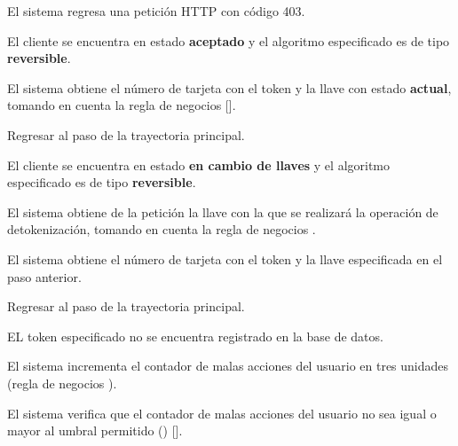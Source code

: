 {\begin{trayectoriaAlternativa}
    \item El sistema regresa una petición HTTP con código 403.

  \end{trayectoriaAlternativa}

  \begin{trayectoriaAlternativa}
    {El cliente se encuentra en estado \textbf{aceptado} y el algoritmo
    especificado es de tipo \textbf{reversible}.}

    \item El sistema obtiene el número de tarjeta con el token y la llave
      con estado \textbf{actual}, tomando en cuenta la regla de negocios
      [].

    \item Regresar al paso  de la trayectoria
      principal.

  \end{trayectoriaAlternativa}

  \begin{trayectoriaAlternativa}
    {El cliente se encuentra en estado \textbf{en cambio de llaves} y el
    algoritmo especificado es de tipo \textbf{reversible}.}

    \item El sistema obtiene de la petición la llave con la que se realizará
      la operación de detokenización, tomando en cuenta la regla de negocios
      .

    \item El sistema obtiene el número de tarjeta con el token y la llave
      especificada en el paso anterior.

    \item Regresar al paso  de la trayectoria
      principal.

  \end{trayectoriaAlternativa}

  \begin{trayectoriaAlternativa}
    {EL token especificado no se encuentra registrado en la base de datos.}

    \item El sistema incrementa el contador de malas acciones del usuario
      en tres unidades (regla de negocios
      ).
    \item El sistema verifica que el contador de malas acciones del usuario no
      sea igual o mayor al umbral permitido
      ()
      [].


\end{trayectoriaAlternativa}}
